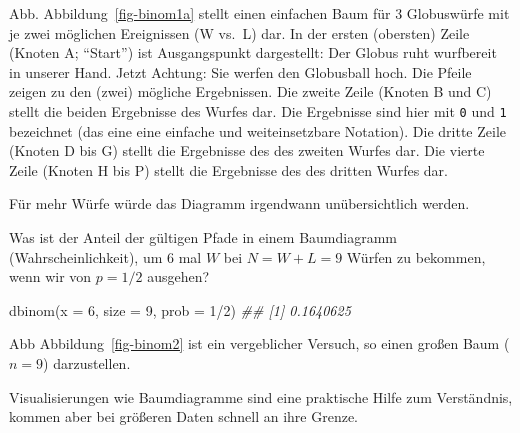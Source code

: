 \documentclass[
  a4paper,
  DIV=11]{scrreprt}
\newenvironment{Shaded}{\begin{snugshade}}{\end{snugshade}}
\newcommand{\AttributeTok}[1]{\textcolor[rgb]{0.40,0.45,0.13}{#1}}
\newcommand{\DecValTok}[1]{\textcolor[rgb]{0.68,0.00,0.00}{#1}}
\newcommand{\DocumentationTok}[1]{\textcolor[rgb]{0.37,0.37,0.37}{\textit{#1}}}
\newcommand{\FunctionTok}[1]{\textcolor[rgb]{0.28,0.35,0.67}{#1}}
\newcommand{\NormalTok}[1]{\textcolor[rgb]{0.00,0.23,0.31}{#1}}
\newcommand{\SpecialCharTok}[1]{\textcolor[rgb]{0.37,0.37,0.37}{#1}}
\theoremstyle{definition}
\theoremstyle{remark}
\begin{document}
Abb. Abbildung~\ref{fig-binom1a} stellt einen einfachen Baum für 3
Globuswürfe mit je zwei möglichen Ereignissen (W vs.~L) dar. In der
ersten (obersten) Zeile (Knoten A; ``Start'') ist Ausgangspunkt
dargestellt: Der Globus ruht wurfbereit in unserer Hand. Jetzt Achtung:
Sie werfen den Globusball hoch. Die Pfeile zeigen zu den (zwei) mögliche
Ergebnissen. Die zweite Zeile (Knoten B und C) stellt die beiden
Ergebnisse des Wurfes dar. Die Ergebnisse sind hier mit \texttt{0} und
\texttt{1} bezeichnet (das eine eine einfache und weiteinsetzbare
Notation). Die dritte Zeile (Knoten D bis G) stellt die Ergebnisse des
des zweiten Wurfes dar. Die vierte Zeile (Knoten H bis P) stellt die
Ergebnisse des des dritten Wurfes dar.

Für mehr Würfe würde das Diagramm irgendwann unübersichtlich werden.

Was ist der Anteil der gültigen Pfade in einem Baumdiagramm
(Wahrscheinlichkeit), um 6 mal \(W\) bei \(N=W+L=9\) Würfen zu bekommen,
wenn wir von \(p=1/2\) ausgehen?

\begin{Shaded}
\begin{Highlighting}[]
\FunctionTok{dbinom}\NormalTok{(}\AttributeTok{x =} \DecValTok{6}\NormalTok{, }\AttributeTok{size =} \DecValTok{9}\NormalTok{, }\AttributeTok{prob =} \DecValTok{1}\SpecialCharTok{/}\DecValTok{2}\NormalTok{)}
\DocumentationTok{\#\# [1] 0.1640625}
\end{Highlighting}
\end{Shaded}

Abb Abbildung~\ref{fig-binom2} ist ein vergeblicher Versuch, so einen
großen Baum (\(n=9\)) darzustellen.

\begin{tcolorbox}[enhanced jigsaw, left=2mm, colframe=quarto-callout-note-color-frame, opacityback=0, arc=.35mm, rightrule=.15mm, breakable, toptitle=1mm, colbacktitle=quarto-callout-note-color!10!white, colback=white, coltitle=black, bottomrule=.15mm, titlerule=0mm, opacitybacktitle=0.6, bottomtitle=1mm, title=\textcolor{quarto-callout-note-color}{\faInfo}\hspace{0.5em}{Hinweis}, toprule=.15mm, leftrule=.75mm]
Visualisierungen wie Baumdiagramme sind eine praktische Hilfe zum
Verständnis, kommen aber bei größeren Daten schnell an ihre Grenze.
\end{tcolorbox}
\end{document}
